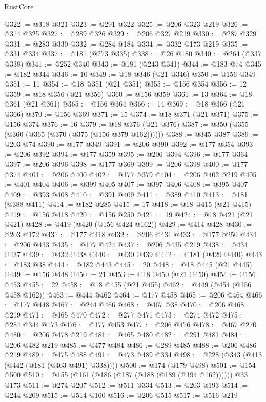 \begin{lexlean}{RustCore}
\begin{coremodule}
@322 := @318 @321
@323 := @291 @322
@325 := @206 @323 @219
@326 := @314 @325
@327 := @289 @326
@329 := @206 @327 @219
@330 := @287 @329
@331 := @283 @330
@332 := @284 @184
@334 := @332 @173 @219
@335 := @331 @334
@337 := @181 (@273 @335)
@338 := @26 @180
@340 := @264 (@337 @338)
@341 := @252 @340
@343 := @181 (@243 @341)
@344 := @183 @74
@345 := @182 @344
@346 := 10
@349 := @18 @346 (@21 @346)
@350 := @156 @349
@351 := 11
@354 := @18 @351 (@21 @351)
@355 := @156 @354
@356 := 12
@359 := @18 @356 (@21 @356)
@360 := @156 @359
@361 := 13
@364 := @18 @361 (@21 @361)
@365 := @156 @364
@366 := 14
@369 := @18 @366 (@21 @366)
@370 := @156 @369
@371 := 15
@374 := @18 @371 (@21 @371)
@375 := @156 @374
@376 := 16
@379 := @18 @376 (@21 @376)
@387 := @350 (@355 (@360 (@365 (@370 (@375 (@156 @379 @162))))))
@388 := @345 @387
@389 := @203 @74
@390 := @177 @349
@391 := @206 @390
@392 := @177 @354
@393 := @206 @392
@394 := @177 @359
@395 := @206 @394
@396 := @177 @364
@397 := @206 @396
@398 := @177 @369
@399 := @206 @398
@400 := @177 @374
@401 := @206 @400
@402 := @177 @379
@404 := @206 @402 @219
@405 := @401 @404
@406 := @399 @405
@407 := @397 @406
@408 := @395 @407
@409 := @393 @408
@410 := @391 @409
@411 := @389 @410
@413 := @181 (@388 @411)
@414 := @182 @285
@415 := 17
@418 := @18 @415 (@21 @415)
@419 := @156 @418
@420 := @156 @250
@421 := 19
@424 := @18 @421 (@21 @421)
@428 := @419 (@420 (@156 @424 @162))
@429 := @414 @428
@430 := @203 @172
@431 := @177 @418
@432 := @206 @431
@433 := @177 @250
@434 := @206 @433
@435 := @177 @424
@437 := @206 @435 @219
@438 := @434 @437
@439 := @432 @438
@440 := @430 @439
@442 := @181 (@429 @440)
@443 := @183 @38
@444 := @182 @443
@445 := 20
@448 := @18 @445 (@21 @445)
@449 := @156 @448
@450 := 21
@453 := @18 @450 (@21 @450)
@454 := @156 @453
@455 := 22
@458 := @18 @455 (@21 @455)
@462 := @449 (@454 (@156 @458 @162))
@463 := @444 @462
@464 := @177 @458
@465 := @206 @464
@466 := @177 @448
@467 := @244 @466
@468 := @467 @38
@470 := @206 @468 @219
@471 := @465 @470
@472 := @277 @471
@473 := @274 @472
@475 := @284 @344 @173
@476 := @177 @453
@477 := @206 @476
@478 := @467 @270
@480 := @206 @478 @219
@481 := @465 @480
@482 := @291 @481
@484 := @206 @482 @219
@485 := @477 @484
@486 := @289 @485
@488 := @206 @486 @219
@489 := @475 @488
@491 := @473 @489 @334
@498 := @228 (@343 (@413 (@442 (@181 (@463 @491) @338))))
@500 := @174 (@179 @498)
@501 := @154 @500
@510 := @155 (@161 (@186 (@187 (@188 (@189 (@194 @162)))))) @33 @173
@511 := @274 @207
@512 := @511 @334
@513 := @203 @193
@514 := @244 @209
@515 := @514 @160
@516 := @206 @515
@517 := @516 @219

\end{coremodule}
\end{lexlean}
